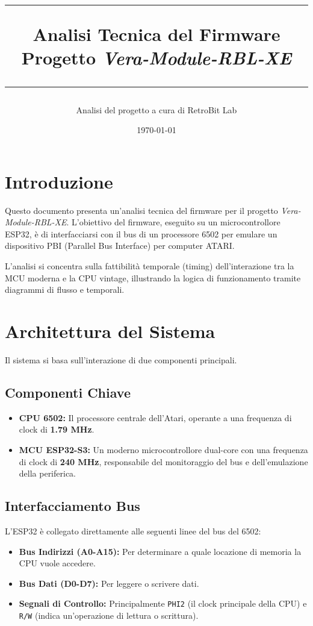 \documentclass[12pt, a4paper]{article}
\title{
    \vspace{2cm}
    \hrule
    \vspace{0.5cm}
    {\Huge \bfseries Analisi Tecnica del Firmware}\\
    \vspace{0.2cm}
    {\Large Progetto \textit{Vera-Module-RBL-XE}}\\
    \vspace{0.5cm}
    \hrule
}
\author{Analisi del progetto a cura di RetroBit Lab}
\date{\today}
\begin{document}
\maketitle
\thispagestyle{empty}

\newpage
\tableofcontents
\thispagestyle{empty}

\newpage
\setcounter{page}{1}

\section{Introduzione}
Questo documento presenta un'analisi tecnica del firmware per il progetto \textit{Vera-Module-RBL-XE}. L'obiettivo del firmware, eseguito su un microcontrollore ESP32, è di interfacciarsi con il bus di un processore 6502 per emulare un dispositivo PBI (Parallel Bus Interface) per computer ATARI.

L'analisi si concentra sulla fattibilità temporale (timing) dell'interazione tra la MCU moderna e la CPU vintage, illustrando la logica di funzionamento tramite diagrammi di flusso e temporali.

\section{Architettura del Sistema}
Il sistema si basa sull'interazione di due componenti principali.

\subsection{Componenti Chiave}
\begin{itemize}
    \item {\bfseries CPU 6502:} Il processore centrale dell'Atari, operante a una frequenza di clock di \textbf{1.79 MHz}.
    \item {\bfseries MCU ESP32-S3:} Un moderno microcontrollore dual-core con una frequenza di clock di \textbf{240 MHz}, responsabile del monitoraggio del bus e dell'emulazione della periferica.
\end{itemize}

\subsection{Interfacciamento Bus}
L'ESP32 è collegato direttamente alle seguenti linee del bus del 6502:
\begin{itemize}
    \item {\bfseries Bus Indirizzi (A0-A15):} Per determinare a quale locazione di memoria la CPU vuole accedere.
    \item {\bfseries Bus Dati (D0-D7):} Per leggere o scrivere dati.
    \item {\bfseries Segnali di Controllo:} Principalmente \texttt{PHI2} (il clock principale della CPU) e \texttt{R/W} (indica un'operazione di lettura o scrittura).
\end{itemize}
\end{document}
